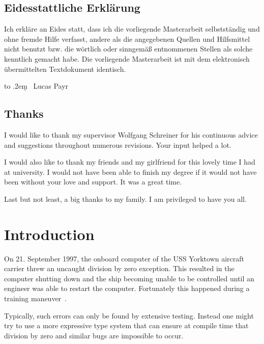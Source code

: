 \documentclass[]{scrbook}
\def\dotsign{\xleaders\hbox to .2em{\d{}}\hfill\d{}}
\theoremstyle{definition}
\theoremstyle{definition}
\theoremstyle{definition}
\theoremstyle{remark}
\begin{document}
\newpage

\section*{Eidesstattliche Erklärung}

Ich erkläre an Eides statt, dass ich die vorliegende Masterarbeit selbstständig und ohne fremde Hilfe verfasst, andere als die angegebenen Quellen und Hilfsmittel nicht benutzt bzw. die wörtlich oder sinngemäß entnommenen Stellen als solche kenntlich gemacht habe.
Die vorliegende Masterarbeit ist mit dem elektronisch übermittelten Textdokument identisch.

\vspace*{20mm}


\makebox[.5\linewidth][r]{}\dotsign\smallskip\newline
\hspace*{.5\linewidth}\ Lucas Payr
\newpage

\section*{Thanks}

I would like to thank my supervisor Wolfgang Schreiner for his continuous advice and suggestions throughout numerous revisions. Your input helped a lot.

I would also like to thank my friends and my girlfriend for this lovely time I had at university. I would not have been able to finish my degree if it would not have been without your love and support. It was a great time.

Last but not least, a big thanks to my family. I am privileged to have you all.

{
\setcounter{tocdepth}{1}
\tableofcontents
}
\chapter{Introduction}\label{introduction}

On 21. September 1997, the onboard computer of the USS Yorktown aircraft
carrier threw an uncaught division by zero exception. This resulted in
the computer shutting down and the ship becoming unable to be controlled
until an engineer was able to restart the computer. Fortunately this
happened during a training maneuver~\autocite{humblePi}.

Typically, such errors can only be found by extensive testing. Instead
one might try to use a more expressive type system that can ensure at
compile time that division by zero and similar bugs are impossible to
occur.
\end{document}
